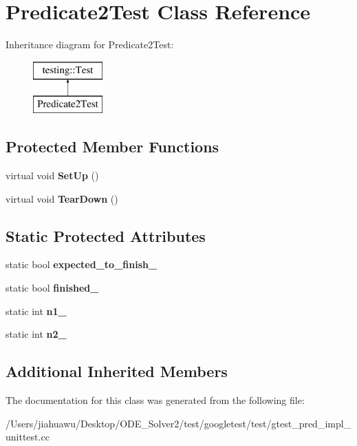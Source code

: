 \hypertarget{class_predicate2_test}{}\section{Predicate2\+Test Class Reference}
\label{class_predicate2_test}
Inheritance diagram for Predicate2\+Test\+:\begin{figure}[H]
\begin{center}
\leavevmode
\includegraphics[height=2.000000cm]{class_predicate2_test}
\end{center}
\end{figure}
\subsection*{Protected Member Functions}
\begin{DoxyCompactItemize}
\item 
\mbox{\label{class_predicate2_test_a9778563daf4846327d32061c1a8ccba0}} 
virtual void {\bfseries Set\+Up} ()
\item 
\mbox{\label{class_predicate2_test_a7379f8f7772af6b4c76edcc90b6aaaeb}} 
virtual void {\bfseries Tear\+Down} ()
\end{DoxyCompactItemize}
\subsection*{Static Protected Attributes}
\begin{DoxyCompactItemize}
\item 
\mbox{\label{class_predicate2_test_a56cf1f0f556addd9a62e0644dc1a86fc}} 
static bool {\bfseries expected\+\_\+to\+\_\+finish\+\_\+}
\item 
\mbox{\label{class_predicate2_test_a30f4ef76d3004253078e767e5c653b85}} 
static bool {\bfseries finished\+\_\+}
\item 
\mbox{\label{class_predicate2_test_ac002d8e279b24e75906fd19973fc2170}} 
static int {\bfseries n1\+\_\+}
\item 
\mbox{\label{class_predicate2_test_a9dbe5173570b9b911af2df889c287027}} 
static int {\bfseries n2\+\_\+}
\end{DoxyCompactItemize}
\subsection*{Additional Inherited Members}


The documentation for this class was generated from the following file\+:\begin{DoxyCompactItemize}
\item 
/\+Users/jiahuawu/\+Desktop/\+O\+D\+E\+\_\+\+Solver2/test/googletest/test/gtest\+\_\+pred\+\_\+impl\+\_\+unittest.\+cc\end{DoxyCompactItemize}
